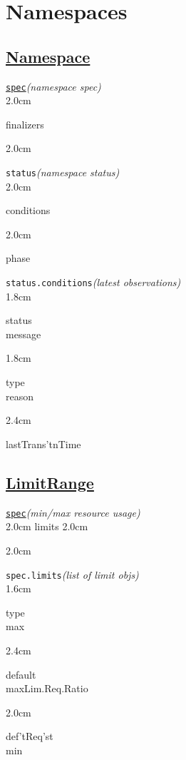 \section{Namespaces}


\subsection*{\href{https://kubernetes.io/docs/concepts/overview/working-with-objects/namespaces/}{Namespace}}

\texttt{\href{https://kubernetes.io/docs/reference/kubernetes-api/cluster-resources/namespace-v1/}{spec}}\quad\textit{(namespace spec)}\\[-2mm]
\api
{2.0cm}{
finalizers

}
{2.0cm}{

}
\stopapi


\texttt{status}\quad\textit{(namespace status)}\\[-2mm]
\api
{2.0cm}{
conditions

}
{2.0cm}{
phase 

}
\stopapi

\texttt{status.conditions}\quad\textit{(latest observations)}\\[-2mm]
\api
{1.8cm}{
status          \\
message

}
{1.8cm}{
type            \\
reason

}
{2.4cm}{
lastTrans'tnTime

}
\stopapi



\subsection*{\href{https://kubernetes.io/docs/concepts/policy/limit-range/}{LimitRange}}

\texttt{\href{https://kubernetes.io/docs/reference/kubernetes-api/policy-resources/limit-range-v1/}{spec}}\quad\textit{(min/max resource usage)}\\[-2mm]
\api
{2.0cm}{
limits
}
{2.0cm}{

}
{2.0cm}{

}
\stopapi

\texttt{spec.limits}\quad\textit{(list of limit objs)}\\[-2mm]
\api
{1.6cm}{
type            \\
max

}
{2.4cm}{
default         \\
maxLim.Req.Ratio

}
{2.0cm}{
def'tReq'st     \\
min

}
\stopapi




